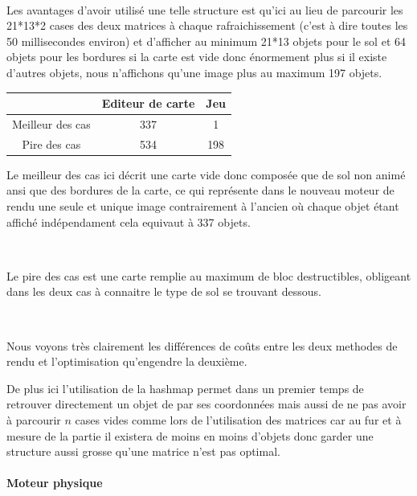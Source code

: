 			$\,$
			
			\newpage

			Les avantages d'avoir utilisé une telle structure est qu'ici au lieu de
			parcourir les 21*13*2 cases des deux matrices à chaque rafraichissement
			(c'est à dire toutes les 50 millisecondes environ) et d'afficher au minimum
			21*13 objets pour le sol et 64 objets pour les bordures si la carte est vide
			donc énormement plus si il existe d'autres objets, nous n'affichons qu'une
			image plus au maximum 197 objets.
			
			\begin{center}
				\begin{tabular}{|c|c|c|} \hline
				  & Editeur de carte & Jeu    \\\hline 
				Meilleur des cas & 337 & 1    \\\hline
				Pire des cas     & 534 & 198  \\\hline		
				\end{tabular}
			\end{center}
			
			Le meilleur des cas ici décrit une carte vide donc composée que de sol non
			animé ansi que des bordures de la carte, ce qui représente dans le nouveau
			moteur de rendu une seule et unique image contrairement à l'ancien où chaque
			objet étant affiché indépendament cela equivaut à 337 objets.
			
			$\,$
			
			Le pire des cas est une carte remplie au maximum de bloc destructibles,
			obligeant dans les deux cas à connaitre le type de sol se trouvant dessous.
			
			$\,$
			
			Nous voyons très clairement les différences de coûts entre les deux methodes
			de rendu et l'optimisation qu'engendre la deuxième.
			
			De plus ici l'utilisation de la hashmap permet dans un premier temps de
			retrouver directement un objet de par ses coordonnées mais aussi de ne pas
			avoir à parcourir $n$ cases vides comme lors de l'utilisation des matrices
			car au fur et à mesure de la partie il existera de moins en moins d'objets
			donc garder une structure aussi grosse qu'une matrice n'est pas optimal.
		
		\paragraph{Moteur physique\\}
		
